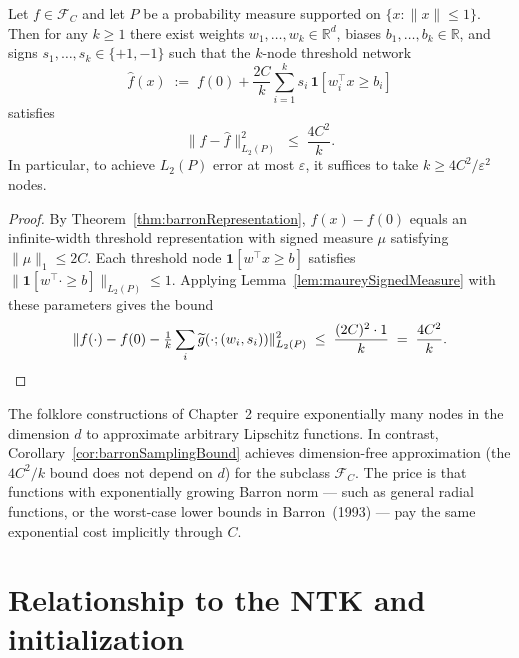 \begin{corollary}\label{cor:barronSamplingBound}
Let $f \in \mathcal{F}_C$ and let $P$ be a probability measure supported on
$\{x : \|x\| \le 1\}$.
Then for any $k \ge 1$ there exist weights $w_1, \ldots, w_k \in \mathbb{R}^d$,
biases $b_1, \ldots, b_k \in \mathbb{R}$, and signs $s_1, \ldots, s_k \in \{+1,-1\}$
such that the $k$-node threshold network
\[
  \widehat{f}(x) \;:=\; f(0) + \frac{2C}{k} \sum_{i=1}^k s_i\, \mathbf{1}[w_i^\top x \ge b_i]
\]
satisfies
\[
  \|f - \widehat{f}\|_{L_2(P)}^2 \;\le\; \frac{4C^2}{k}.
\]
In particular, to achieve $L_2(P)$ error at most $\varepsilon$, it suffices to take
$k \ge 4C^2/\varepsilon^2$ nodes.
\end{corollary}

\begin{proof}
By Theorem~\ref{thm:barronRepresentation}, $f(x) - f(0)$ equals an infinite-width
threshold representation with signed measure $\mu$ satisfying $\|\mu\|_1 \le 2C$.
Each threshold node $\mathbf{1}[w^\top x \ge b]$ satisfies
$\|\mathbf{1}[w^\top \cdot \ge b]\|_{L_2(P)} \le 1$.
Applying Lemma~\ref{lem:maureySignedMeasure} with these parameters gives the bound
\[
  \|f(\cdot) - f(0) - \tfrac{1}{k}\sum_i \widetilde{g}(\cdot; (w_i, s_i))\|_{L_2(P)}^2
  \;\le\; \frac{(2C)^2 \cdot 1}{k} \;=\; \frac{4C^2}{k}. \qedhere
\]
\end{proof}

\begin{remark}
The folklore constructions of Chapter~2 require exponentially many nodes in the dimension
$d$ to approximate arbitrary Lipschitz functions.
In contrast, Corollary~\ref{cor:barronSamplingBound} achieves dimension-free approximation
(the $4C^2/k$ bound does not depend on $d$) for the subclass $\mathcal{F}_C$.
The price is that functions with exponentially growing Barron norm — such as general
radial functions, or the worst-case lower bounds in Barron~(1993) — pay the same
exponential cost implicitly through $C$.
\end{remark}

\section{Relationship to the NTK and initialization}
\label{sec:barron-ntk}

